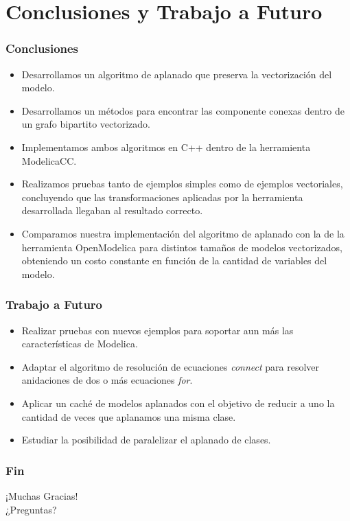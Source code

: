 \section{Conclusiones y Trabajo a Futuro}
\begin{frame}
\frametitle{Conclusiones}
\begin{itemize}
 \item Desarrollamos un algoritmo de aplanado que preserva la vectorización del modelo.
 \item Desarrollamos un métodos para encontrar las componente conexas dentro de un grafo bipartito vectorizado.
 \item Implementamos ambos algoritmos en C++ dentro de la herramienta ModelicaCC.
 \item Realizamos pruebas tanto de ejemplos simples como de ejemplos vectoriales, concluyendo que las transformaciones aplicadas por la herramienta desarrollada llegaban al resultado correcto.
 \item Comparamos nuestra implementación del algoritmo de aplanado con la de la herramienta OpenModelica para distintos tamaños de modelos vectorizados, obteniendo un costo constante en función de la cantidad de variables del modelo. 
 
\end{itemize}
\end{frame}


\begin{frame}
\frametitle{Trabajo a Futuro}
\begin{itemize}
\item Realizar pruebas con nuevos ejemplos para soportar aun más las características de Modelica.

\item Adaptar el algoritmo de resolución de ecuaciones \textit{connect} para resolver anidaciones de dos o más ecuaciones \textit{for}.

\item Aplicar un caché de modelos aplanados con el objetivo de reducir a uno la cantidad de veces que aplanamos una misma clase.  

\item Estudiar la posibilidad de paralelizar el aplanado de clases.  
  
\end{itemize}
\end{frame}

\begin{frame}[fragile]
\frametitle{Fin} 
\begin{center}
\huge ¡Muchas Gracias! \\
\LARGE ¿Preguntas?
\end{center}
\end{frame}

